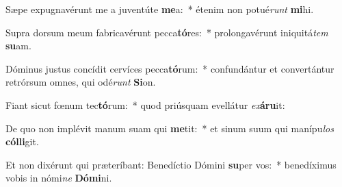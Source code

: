 \item Sæpe expugnavérunt me a juventúte \textbf{me}a:~* étenim non potué\textit{runt} \textbf{mi}hi.
\item Supra dorsum meum fabricavérunt pecca\textbf{tó}res:~* prolongavérunt iniquitá\textit{tem} \textbf{su}am.
\item Dóminus justus concídit cervíces pecca\textbf{tó}rum:~* confundántur et convertántur retrórsum omnes, qui odé\textit{runt} \textbf{Si}on.
\item Fiant sicut fœnum tec\textbf{tó}rum:~* quod priúsquam evellátur \textit{ex}\textbf{á}\textbf{ru}it:
\item De quo non implévit manum suam qui \textbf{me}tit:~* et sinum suum qui manípu\textit{los} \textbf{cól}\textbf{li}git.
\item Et non dixérunt qui præteríbant: Benedíctio Dómini \textbf{su}per vos:~* benedíximus vobis in nómi\textit{ne} \textbf{Dó}\textbf{mi}ni.
